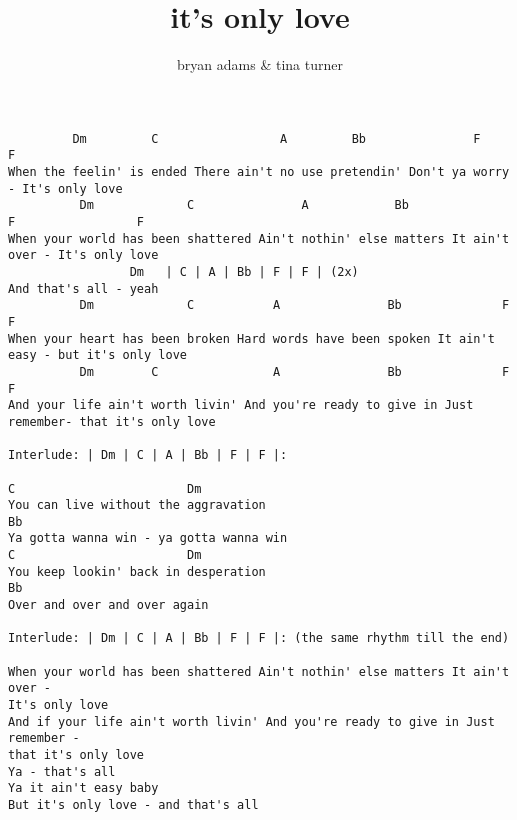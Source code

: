 \author{bryan adams \& tina turner}
\title{it's only love}
\maketitle
\begin{verbatim}
         Dm         C                 A         Bb               F                 F
When the feelin' is ended There ain't no use pretendin' Don't ya worry - It's only love
          Dm             C               A            Bb              F                 F
When your world has been shattered Ain't nothin' else matters It ain't over - It's only love
                 Dm   | C | A | Bb | F | F | (2x)
And that's all - yeah
          Dm             C           A               Bb              F                   F
When your heart has been broken Hard words have been spoken It ain't easy - but it's only love
          Dm        C                A               Bb              F                     F
And your life ain't worth livin' And you're ready to give in Just remember- that it's only love

Interlude: | Dm | C | A | Bb | F | F |:

C                        Dm
You can live without the aggravation
Bb
Ya gotta wanna win - ya gotta wanna win
C                        Dm
You keep lookin' back in desperation
Bb
Over and over and over again

Interlude: | Dm | C | A | Bb | F | F |: (the same rhythm till the end)

When your world has been shattered Ain't nothin' else matters It ain't over -
It's only love
And if your life ain't worth livin' And you're ready to give in Just remember -
that it's only love
Ya - that's all
Ya it ain't easy baby
But it's only love - and that's all
\end{verbatim}